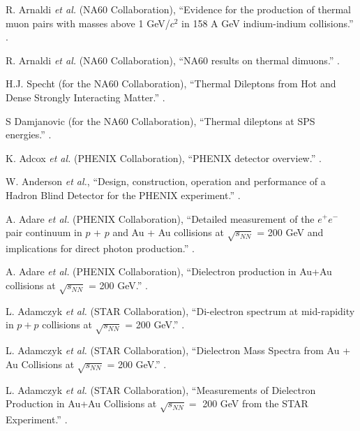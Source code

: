 \begin{thebibliography}{10}
R. Arnaldi {\it et al.} (NA60 Collaboration),
\newblock ``Evidence for the production of thermal muon pairs with masses above 1 GeV/$c^{2}$ in 158 A GeV indium-indium collisions.''
.

R. Arnaldi {\it et al.} (NA60 Collaboration),
\newblock ``NA60 results on thermal dimuons.''
.

H.J. Specht (for the NA60 Collaboration),
\newblock ``Thermal Dileptons from Hot and Dense Strongly Interacting Matter.''
.

S Damjanovic (for the NA60 Collaboration),
\newblock ``Thermal dileptons at SPS energies.''
.

K. Adcox {\it et al.} (PHENIX Collaboration),
\newblock ``PHENIX detector overview.''
.

W. Anderson {\it et al.},
\newblock ``Design, construction, operation and performance of a Hadron Blind Detector for the PHENIX experiment.''
.

A. Adare {\it et al.} (PHENIX Collaboration),
\newblock ``Detailed measurement of the $e^{+}e^{-}$ pair continuum in $p$ + $p$ and Au + Au collisions at $\sqrt{s_{NN}}$ = 200 GeV and implications for direct photon production.''
.

A. Adare {\it et al.} (PHENIX Collaboration),
\newblock ``Dielectron production in Au+Au collisions at $\sqrt{s_{NN}}$ = 200 GeV.''
.

L. Adamczyk {\it et al.} (STAR Collaboration),
\newblock ``Di-electron spectrum at mid-rapidity in $p+p$ collisions at $\sqrt{s_{NN}}$ = 200 GeV.''
.

L. Adamczyk {\it et al.} (STAR Collaboration),
\newblock ``Dielectron Mass Spectra from Au + Au Collisions at $\sqrt{s_{NN}}$ = 200 GeV.''
.

L. Adamczyk {\it et al.} (STAR Collaboration),
\newblock ``Measurements of Dielectron Production in Au+Au Collisions at $\sqrt{s_{NN}} =$ 200 GeV from the STAR Experiment.''
.


\end{thebibliography}

